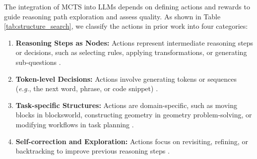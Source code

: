The integration of MCTS into LLMs depends on defining actions and rewards to guide reasoning path exploration and assess quality. As shown in Table \ref{tab:structure_search}, we classify the actions in prior work into four categories: 
\begin{enumerate}[itemindent=0em]
\item \textbf{Reasoning Steps as Nodes:} Actions represent intermediate reasoning steps or decisions, such as selecting rules, applying transformations, or generating sub-questions \cite{hao2023reasoning, DBLP:journals/corr/abs-2405-00451, wan2024alphazero, DBLP:journals/corr/abs-2412-09078}.

\item \textbf{Token-level Decisions:} Actions involve generating tokens or sequences (\emph{e.g.}, the next word, phrase, or code snippet) \cite{liu2024dontthrowawayvalue, DBLP:journals/corr/abs-2411-04329, DBLP:journals/corr/abs-2412-11605, DBLP:journals/corr/abs-2410-16033}.

\item \textbf{Task-specific Structures:} Actions are domain-specific, such as moving blocks in blocksworld, constructing geometry in geometry problem-solving, or modifying workflows in task planning \cite{DBLP:journals/corr/abs-2412-10673, DBLP:journals/corr/abs-2405-15383, DBLP:conf/nips/ZhaoLH23}.

\item \textbf{Self-correction and Exploration:} Actions focus on revisiting, refining, or backtracking to improve previous reasoning steps \cite{jiang2024intrinsicselfcorrectionenhancementmonte, DBLP:journals/corr/abs-2409-09584, DBLP:journals/corr/abs-2406-07394}.
\end{enumerate}




